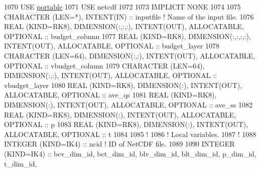 \begin{DoxyCode}
1070     \textcolor{keywordtype}{USE }\hyperlink{namespaceportable}{portable}
1071     \textcolor{keywordtype}{USE }netcdf
1072 
1073     \textcolor{keywordtype}{IMPLICIT NONE}
1074 
1075     \textcolor{keywordtype}{CHARACTER (LEN=*)}, \textcolor{keywordtype}{INTENT(IN)}                                           :: inputfile    \textcolor{comment}{! Name of the
       input file.}
1076     \textcolor{keywordtype}{REAL (KIND=RK8)}, \textcolor{keywordtype}{DIMENSION(:,:,:)}, \textcolor{keywordtype}{INTENT(OUT)}, \textcolor{keywordtype}{ALLOCATABLE}, \textcolor{keywordtype}{OPTIONAL}   :: budget\_column
1077     \textcolor{keywordtype}{REAL (KIND=RK8)}, \textcolor{keywordtype}{DIMENSION(:,:,:,:)}, \textcolor{keywordtype}{INTENT(OUT)}, \textcolor{keywordtype}{ALLOCATABLE}, \textcolor{keywordtype}{OPTIONAL} :: budget\_layer
1078     \textcolor{keywordtype}{CHARACTER (LEN=64)}, \textcolor{keywordtype}{DIMENSION(:,:)}, \textcolor{keywordtype}{INTENT(OUT)}, \textcolor{keywordtype}{ALLOCATABLE}, \textcolor{keywordtype}{OPTIONAL}  :: vbudget\_column
1079     \textcolor{keywordtype}{CHARACTER (LEN=64)}, \textcolor{keywordtype}{DIMENSION(:,:)}, \textcolor{keywordtype}{INTENT(OUT)}, \textcolor{keywordtype}{ALLOCATABLE}, \textcolor{keywordtype}{OPTIONAL}  :: vbudget\_layer
1080     \textcolor{keywordtype}{REAL (KIND=RK8)}, \textcolor{keywordtype}{DIMENSION(:)}, \textcolor{keywordtype}{INTENT(OUT)}, \textcolor{keywordtype}{ALLOCATABLE}, \textcolor{keywordtype}{OPTIONAL}       :: ave\_qs
1081     \textcolor{keywordtype}{REAL (KIND=RK8)}, \textcolor{keywordtype}{DIMENSION(:)}, \textcolor{keywordtype}{INTENT(OUT)}, \textcolor{keywordtype}{ALLOCATABLE}, \textcolor{keywordtype}{OPTIONAL}       :: ave\_ss
1082     \textcolor{keywordtype}{REAL (KIND=RK8)}, \textcolor{keywordtype}{DIMENSION(:)}, \textcolor{keywordtype}{INTENT(OUT)}, \textcolor{keywordtype}{ALLOCATABLE}, \textcolor{keywordtype}{OPTIONAL}       :: p
1083     \textcolor{keywordtype}{REAL (KIND=RK8)}, \textcolor{keywordtype}{DIMENSION(:)}, \textcolor{keywordtype}{INTENT(OUT)}, \textcolor{keywordtype}{ALLOCATABLE}, \textcolor{keywordtype}{OPTIONAL}       :: t
1084 
1085     \textcolor{comment}{!}
1086     \textcolor{comment}{! Local variables.}
1087     \textcolor{comment}{!}
1088     \textcolor{keywordtype}{INTEGER (KIND=IK4)}          :: ncid                                                 \textcolor{comment}{! ID of NetCDF
       file.}
1089 
1090     \textcolor{keywordtype}{INTEGER (KIND=IK4)}          :: bcv\_dim\_id, bct\_dim\_id, blv\_dim\_id, blt\_dim\_id, p\_dim\_id, t\_dim\_id, 

\end{DoxyCode}

